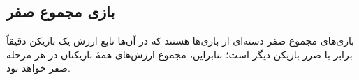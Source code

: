 %
%
%
%
%	
%	
%	


















\subsection{بازی مجموع صفر}

بازی‌های مجموع صفر
دسته‌ای از بازی‌ها هستند که در آن‌ها تابع ارزش یک بازیکن دقیقاً برابر با ضرر بازیکن دیگر است؛ بنابراین، مجموع ارزش‌های همهٔ بازیکنان در هر مرحله صفر خواهد بود.

